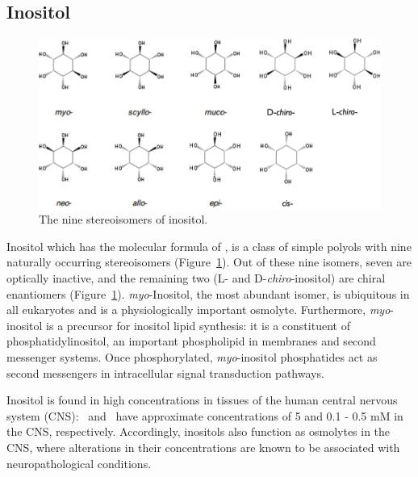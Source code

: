 \subsection{Inositol}
\begin{figure}
	\centering
	\includegraphics[width=5in]{figures/introduction/inositol.pdf}
	\caption[Inositol stereoisomers]{The nine stereoisomers of inositol.}
	\label{fig:inositols}
\end{figure}

Inositol which has the molecular formula of , is a class of simple polyols with nine naturally occurring stereoisomers (Figure~\ref{fig:inositols}). Out of these nine isomers, seven are optically inactive, and the remaining two (L- and D-\emph{chiro}-inositol) are chiral enantiomers (Figure~\ref{fig:inositols}). \emph{myo}-Inositol, the most abundant isomer, is ubiquitous in all eukaryotes and is a physiologically important osmolyte. Furthermore, \emph{myo}-inositol is a precursor for inositol lipid synthesis: it is a constituent of phosphatidylinositol, an important phospholipid in membranes and second messenger systems. Once phosphorylated, \emph{myo}-inositol phosphatides act as second messengers in intracellular signal transduction pathways.\cite{Fisher:2002tk} 

Inositol is found in high concentrations in tissues of the human central nervous system (CNS): \myo\ and \scylloi\ have approximate concentrations of 5 and 0.1 - 0.5 mM in the CNS, respectively.\cite{Fisher:2002tk} Accordingly, inositols also function as osmolytes in the CNS, where alterations in their concentrations are known to be associated with neuropathological conditions.\cite{Michaelis:1993gf, Fisher:2002tk}

